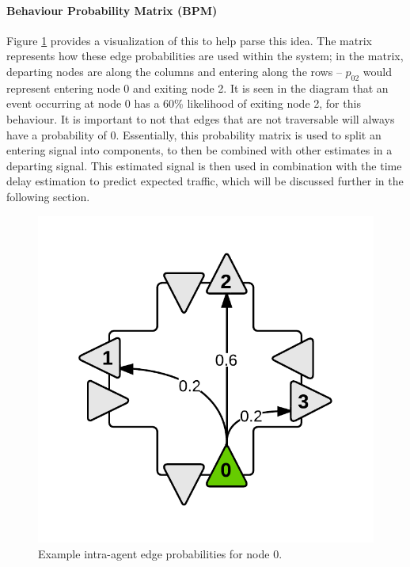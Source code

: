 \documentclass{report}
\begin{document}
\paragraph{Behaviour Probability Matrix (BPM)}
Figure \ref{fig:BPM-example} provides a visualization of this to help parse this idea. 
The matrix represents how these edge probabilities are used within the system; in the matrix, departing nodes are along the columns and entering along the rows -- $p_{02}$ would represent entering node 0 and exiting node 2. 
It is seen in the diagram that an event occurring at node 0 has a 60\% likelihood of exiting node 2, for this behaviour.
 It is important to not that edges that are not traversable will always have a probability of 0. 
Essentially, this probability matrix is used to split an entering signal into components, to then be combined with other estimates in a departing signal. 
This estimated signal is then used in combination with the time delay estimation to predict expected traffic, which will be discussed further in the following section.

\begin{figure}[H]
  \begin{centering}
    \includegraphics[scale=0.3]{figures/BPM-example.png}
    \caption{Example intra-agent edge probabilities for node 0.}
    \label{fig:BPM-example}
  \end{centering}
\end{figure}
\end{document}
